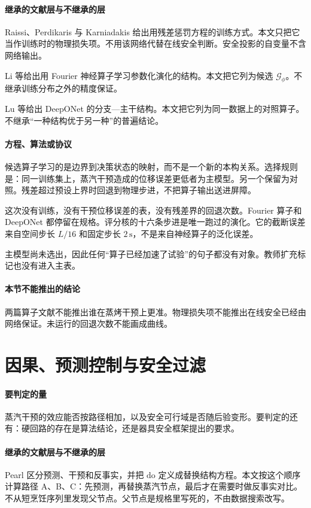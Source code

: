 \paragraph{继承的文献层与不继承的层}
Raissi、Perdikaris 与 Karniadakis 给出用残差惩罚方程的训练方式\cite{raissi2019}。本文只把它当作训练时的物理损失项。不用该网络代替在线安全判断。安全投影的自变量不含网络输出。

Li 等给出用 Fourier 神经算子学习参数化演化的结构\cite{li2021fno}。本文把它列为候选 $\mathcal{G}_\phi$。不继承训练分布之外的精度保证。

Lu 等给出 DeepONet 的分支—主干结构\cite{lu2021deeponet}。本文把它列为同一数据上的对照算子。不继承“一种结构优于另一种”的普遍结论。

\paragraph{方程、算法或协议}
候选算子学习的是边界到决策状态的映射，而不是一个新的本构关系。选择规则是：同一训练集上，蒸汽干预造成的位移误差更低者为主模型。另一个保留为对照。残差超过预设上界时回退到物理步进，不把算子输出送进屏障。

这次没有训练，没有干预位移误差的表，没有残差界的回退次数。Fourier 算子和 DeepONet 都停留在规格。评分核的十六条步进是唯一跑过的演化。它的截断误差来自空间步长 $L/16$ 和固定步长 $2\,\mathrm{s}$，不是来自神经算子的泛化误差。

主模型尚未选出，因此任何“算子已经加速了试验”的句子都没有对象。教师扩充标记也没有进入主表。

\paragraph{本节不能推出的结论}
两篇算子文献不能推出谁在蒸烤干预上更准。物理损失项不能推出在线安全已经由网络保证。未运行的回退次数不能画成曲线。

\section{因果、预测控制与安全过滤}

\paragraph{要判定的量}
蒸汽干预的效应能否按路径相加，以及安全可行域是否随后验变形。要判定的还有：硬回路的存在是算法结论，还是器具安全框架提出的要求。

\paragraph{继承的文献层与不继承的层}
Pearl 区分预测、干预和反事实，并把 $\mathrm{do}$ 定义成替换结构方程\cite{pearl2009}。本文按这个顺序计算路径 A、B、C：先预测，再替换蒸汽节点，最后才在需要时做反事实对比。不从短烹饪序列里发现父节点。父节点是规格里写死的，不由数据搜索改写。

